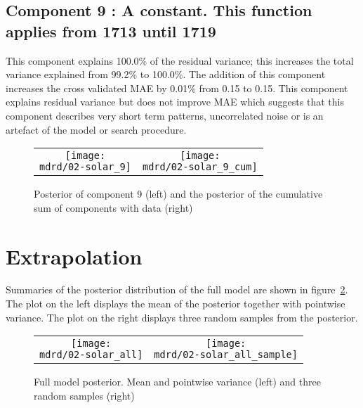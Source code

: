 \documentclass{article} %
\begin{document}
\subsection{Component 9 : A constant. This function applies from 1713 until 1719}



This component explains 100.0\% of the residual variance; this increases the total variance explained from 99.2\% to 100.0\%.
The addition of this component increases the cross validated MAE by 0.01\% from 0.15 to 0.15.
This component explains residual variance but does not improve MAE which suggests that this component describes very short term patterns, uncorrelated noise or is an artefact of the model or search procedure.

\begin{figure}[H]
\newcommand{\wmgd}{0.5\columnwidth}
\newcommand{\hmgd}{3.0cm}
\newcommand{\mdrd}{figures/02-solar}
\newcommand{\mbm}{\hspace{-0.3cm}}
\begin{tabular}{cc}
\mbm \texttt{[image: \\mdrd/02-solar\_9]} & \texttt{[image: \\mdrd/02-solar\_9\_cum]}
\end{tabular}
\caption{Posterior of component 9 (left) and the posterior of the cumulative sum of components with data (right)}
\label{fig:comp9}
\end{figure}

\section{Extrapolation}

Summaries of the posterior distribution of the full model are shown in figure~\ref{fig:extrap}.
The plot on the left displays the mean of the posterior together with pointwise variance.
The plot on the right displays three random samples from the posterior.

\begin{figure}[H]
\newcommand{\wmgd}{0.5\columnwidth}
\newcommand{\hmgd}{3.0cm}
\newcommand{\mdrd}{figures/02-solar}
\newcommand{\mbm}{\hspace{-0.3cm}}
\begin{tabular}{cc}
\mbm \texttt{[image: \\mdrd/02-solar\_all]} & \texttt{[image: \\mdrd/02-solar\_all\_sample]}
\end{tabular}
\caption{Full model posterior. Mean and pointwise variance (left) and three random samples (right)}
\label{fig:extrap}
\end{figure}
\end{document}
